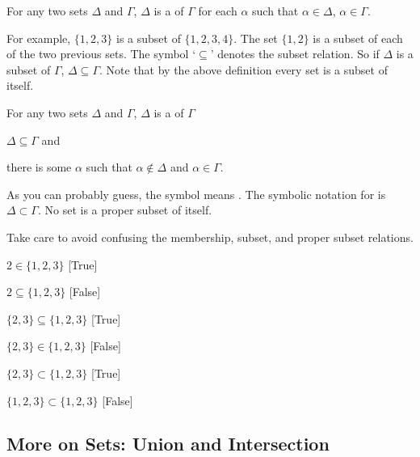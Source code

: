 \begin{majorILnc}{} For any two sets $\Delta$ and $\Gamma$, $\Delta$ is a  of $\Gamma$ \Iff for each $\alpha$ such that $\alpha \in \Delta$, $\alpha \in \Gamma$.
\end{majorILnc} 

\noindent{}For example, $\{1, 2, 3\}$ is a subset of $\{1, 2, 3, 4\}$. The set $\{1, 2\}$ is a subset of each of the two previous sets.  The symbol `$\subseteq$' denotes the subset relation.  So if $\Delta$ is a subset of $\Gamma$, $\Delta \subseteq \Gamma$. Note that by the above definition every set is a subset of itself.

\begin{majorILnc}{} For any two sets $\Delta$ and $\Gamma$, $\Delta$ is a  of $\Gamma$ \Iff 
	\begin{cenumerate}
		\item $\Delta \subseteq \Gamma$ and
		\item there is some $\alpha$ such that $\alpha \notin \Delta$ and $\alpha \in \Gamma$.
	\end{cenumerate}
\end{majorILnc}

\noindent{}As you can probably guess, the \mention{$\notin$} symbol means . The symbolic notation for  is $\Delta \subset \Gamma$. No set is a proper subset of itself.

Take care to avoid confusing the membership, subset, and proper subset relations.

\begin{menumerate}
	\item $2\in\{1, 2, 3\}$ [True]
	\item $2\subseteq\{1, 2, 3\}$ [False]
	\item $\{2, 3\}\subseteq\{1, 2, 3\}$ [True]
	\item $\{2, 3\}\in\{1, 2, 3\}$ [False]
	\item $\{2, 3\}\subset\{1, 2, 3\}$ [True]
	\item $\{1, 2, 3\}\subset\{1, 2, 3\}$ [False]
\end{menumerate}

\subsection{More on Sets: Union and Intersection}\label{moreonsets}

